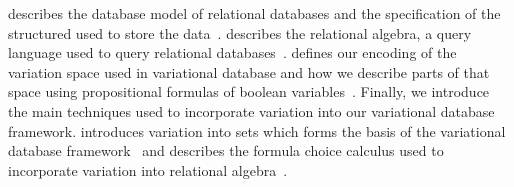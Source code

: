 %
 describes the database model of relational databases and 
the specification of
the structured used to store the data~\cite{AliceBook}. 
 describes the relational algebra, a query language used to query relational databases~\cite{AliceBook}.
%
 defines our encoding of the variation space used in 
variational database and how we describe parts of that space using propositional formulas of boolean variables~\cite{ATW18poly,ATW17dbpl}.
%
Finally, we introduce the main techniques used to incorporate variation into our variational 
database framework.
 introduces variation into sets which forms the basis of the variational database
framework~\cite{EWC13fosd,Walk14onward,ATW17dbpl} 
and  describes the formula choice calculus used to incorporate 
variation into relational algebra~\cite{HW16fosd}.



%




